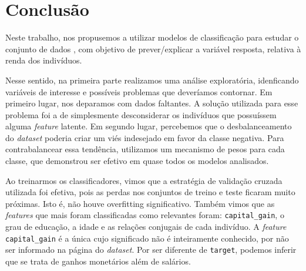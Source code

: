 \section{Conclusão}

Neste trabalho, nos propusemos a utilizar modelos de classificação para estudar o conjunto de dados \cite{uci}, com objetivo de prever/explicar a variável resposta, relativa à renda dos indivíduos.

Nesse sentido, na primeira parte realizamos uma análise exploratória, idenficando variáveis de interesse e possíveis problemas que deveríamos contornar.
Em primeiro lugar, nos deparamos com dados faltantes.
A solução utilizada para esse problema foi a de simplesmente desconsiderar os indivíduos que possuíssem alguma \emph{feature} latente.
Em segundo lugar, percebemos que o desbalanceamento do \emph{dataset} poderia criar um viés indesejado em favor da classe negativa.
Para contrabalancear essa tendência, utilizamos um mecanismo de pesos para cada classe, que demonstrou ser efetivo em quase todos os modelos analisados.

Ao treinarmos os classificadores, vimos que a estratégia de validação cruzada utilizada foi efetiva, pois as perdas nos conjuntos de treino e teste ficaram muito próximas.
Isto é, não houve overfitting significativo.
Também vimos que as \emph{features} que mais foram classificadas como relevantes foram: \verb|capital_gain|, o grau de educação, a idade e as relações conjugais de cada indivíduo.
A \emph{feature} \verb|capital_gain| é a única cujo significado não é inteiramente conhecido, por não ser informado na página do \emph{dataset}.
Por ser diferente de \verb|target|, podemos inferir que se trata de ganhos monetários além de salários.
